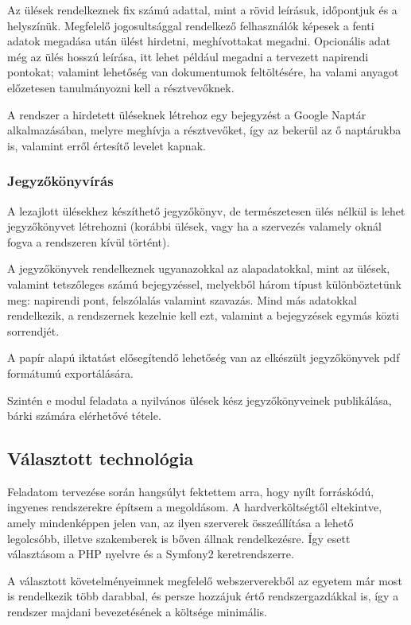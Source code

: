 \documentclass[a4paper,12pt,oneside]{report}
\begin{document}
Az ülések rendelkeznek fix számú adattal, mint a rövid leírásuk, időpontjuk és a helyszínük. Megfelelő jogosultsággal rendelkező felhasználók képesek a fenti adatok megadása után ülést hirdetni, meghívottakat megadni. Opcionális adat még az ülés hosszú leírása, itt lehet például megadni a tervezett napirendi pontokat; valamint lehetőség van dokumentumok feltöltésére, ha valami anyagot előzetesen tanulmányozni kell a résztvevőknek.

A rendszer a hirdetett üléseknek létrehoz egy bejegyzést a Google Naptár alkalmazásában, melyre meghívja a résztvevőket, így az bekerül az ő naptárukba is, valamint erről értesítő levelet kapnak.

\subsubsection{Jegyzőkönyvírás}

A lezajlott ülésekhez készíthető jegyzőkönyv, de természetesen ülés nélkül is lehet jegyzőkönyvet létrehozni (korábbi ülések, vagy ha a szervezés valamely oknál fogva a rendszeren kívül történt).

A jegyzőkönyvek rendelkeznek ugyanazokkal az alapadatokkal, mint az ülések, valamint tetszőleges számú bejegyzéssel, melyekből három típust különböztetünk meg: napirendi pont, felszólalás valamint szavazás. Mind más adatokkal rendelkezik, a rendszernek kezelnie kell ezt, valamint a bejegyzések egymás közti sorrendjét.

A papír alapú iktatást elősegítendő lehetőség van az elkészült jegyzőkönyvek pdf formátumú exportálására.

Szintén e modul feladata a nyilvános ülések kész jegyzőkönyveinek publikálása, bárki számára elérhetővé tétele.

\subsection{Választott technológia}

Feladatom tervezése során hangsúlyt fektettem arra, hogy nyílt forráskódú, ingyenes rendszerekre építsem a megoldásom. A hardverköltségtől eltekintve, amely mindenképpen jelen van, az ilyen szerverek összeállítása a lehető legolcsóbb, illetve szakemberek is bőven állnak rendelkezésre. Így esett választásom a PHP nyelvre és a Symfony2 keretrendszerre.

A választott követelményeimnek megfelelő webszerverekből az egyetem már most is rendelkezik több darabbal, és persze hozzájuk értő rendszergazdákkal is, így a rendszer majdani bevezetésének a költsége minimális.
\end{document}
